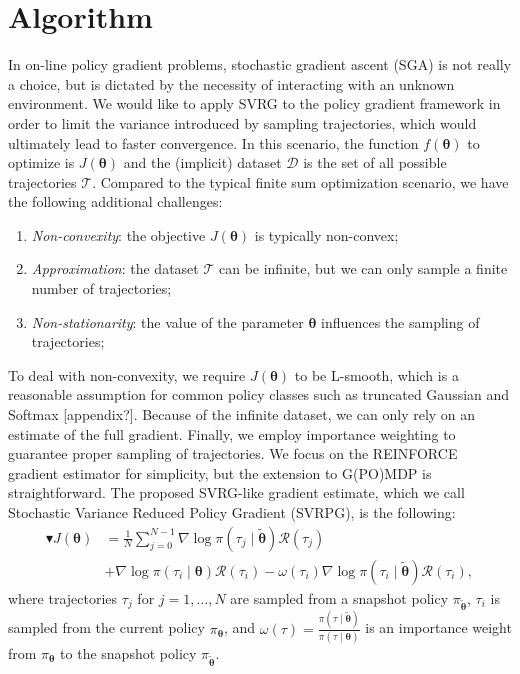 \documentclass{article}
\theoremstyle{remark}
\theoremstyle{definition}
\newcommand{\vtheta}{\boldsymbol{\theta}}
\newcommand{\Reward}{\mathcal{R}}
\newcommand{\pol}{\pi_{\vtheta}}
\begin{document}
\section{Algorithm}\label{sec:algo}
In on-line policy gradient problems, stochastic gradient ascent (SGA) is not really a choice, but is dictated by the necessity of interacting with an unknown environment. We would like to apply SVRG to the policy gradient framework in order to limit the variance introduced by sampling trajectories, which would ultimately lead to faster convergence. In this scenario, the function $f(\vtheta)$ to optimize is $J(\vtheta)$ and the (implicit) dataset $\mathcal{D}$ is the set of all possible trajectories $\mathcal{T}$. Compared to the typical finite sum optimization scenario, we have the following additional challenges:
\begin{enumerate}
	\item \textit{Non-convexity}: the objective $J(\vtheta)$ is typically non-convex;
	\item \textit{Approximation}: the dataset $\mathcal{T}$ can be infinite, but we can only sample a finite number of trajectories;
	\item \textit{Non-stationarity}: the value of the parameter $\vtheta$ influences the sampling of trajectories;
\end{enumerate}
To deal with non-convexity, we require $J(\vtheta)$ to be L-smooth, which is a reasonable assumption for common policy classes such as truncated Gaussian and Softmax [appendix?]. Because of the infinite dataset, we can only rely on an estimate of the full gradient. Finally, we employ importance weighting \cite{rubinstein1981simulation} \cite{precup2000eligibility} to guarantee proper sampling of trajectories. 
We focus on the REINFORCE gradient estimator for simplicity, but the extension to G(PO)MDP is straightforward. The proposed SVRG-like gradient estimate, which we call Stochastic Variance Reduced Policy Gradient (SVRPG), is the following:
\begin{align*}
	\blacktriangledown J(\vtheta) &= \frac{1}{N}\sum_{j=0}^{N-1}\nabla\log\pi(\tau_j \mid \tilde{\vtheta})\Reward(\tau_j) \\
		&+ \nabla\log\pi(\tau_i \mid \vtheta)\Reward(\tau_i) 
		- \omega(\tau_i)\nabla\log\pi(\tau_i \mid \tilde{\vtheta})\Reward(\tau_i),
\end{align*}
where trajectories $\tau_j$ for $j=1,\dots,N$ are sampled from a snapshot policy $\pi_{\tilde{\vtheta}}$, $\tau_i$ is sampled from the current policy $\pol$, and $\omega(\tau) = \frac{\pi(\tau\mid\tilde{\vtheta})}{\pi(\tau\mid\vtheta)}$ is an importance weight from $\pol$ to the snapshot policy $\pi_{\tilde{\vtheta}}$. 
\end{document}
